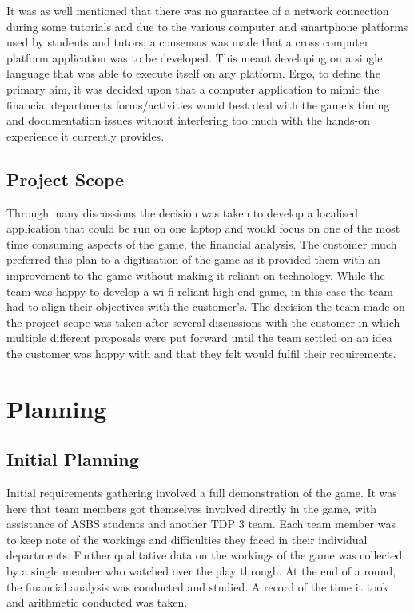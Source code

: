 \documentclass{l3proj}
\begin{document}
It was as well mentioned that there was no guarantee of a network connection during some tutorials and due to the various computer and smartphone platforms used by students and tutors; a consensus was made that a cross computer platform application was to be developed. This meant developing on a single language that was able to execute itself on any platform.
Ergo, to define the primary aim, it was decided upon that a computer application to mimic the financial departments forms/activities would best deal with the game's timing and documentation issues without interfering too much with the hands-on experience it currently provides.

\subsection{Project Scope}
 Through many discussions the decision was taken to develop a localised application that could be run on one laptop and would focus on one of the most time consuming aspects of the game, the financial analysis. The customer much preferred this plan to a digitisation of the game as it provided them with an improvement to the game without making it reliant on technology. While the team was happy to develop a wi-fi reliant high end game, in this case the team had to align their objectives with the customer's. The decision the team made on the project scope was taken after several discussions with the customer in which multiple different proposals were put forward until the team settled on an idea the customer was happy with and that they felt would fulfil their requirements.
\section{Planning}
\label{sec:planning}

\subsection{Initial Planning}
Initial requirements gathering involved a full demonstration of the game. It was here that team members got themselves involved directly in the game, with assistance of ASBS students and another TDP 3 team. Each team member was to keep note of the workings and difficulties they faced in their individual departments. Further qualitative data on the workings of the game was collected by a single member who watched over the play through. At the end of a round, the financial analysis was conducted and studied. A record of the time it took and arithmetic conducted was taken.
\end{document}

